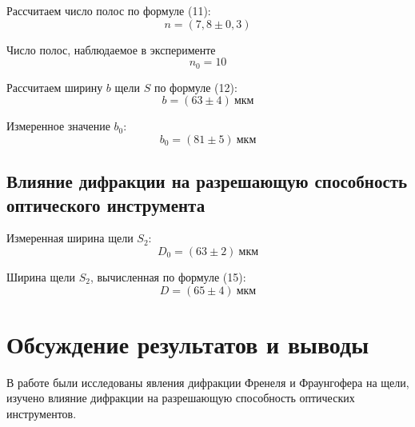 \documentclass[a4paper, 12pt]{article}
\begin{document}
Рассчитаем число полос по формуле (11):
\[
    n = (7,8 \pm 0,3) 
\]

Число полос, наблюдаемое в эксперименте
\[
    n_0 = 10
\]

Рассчитаем ширину $b$ щели $S$ по формуле (12):
\[
    b = (63\pm 4)\ \text{мкм}
\]

Измеренное значение  $b_0$:
\[
    b_0 = (81\pm 5)\ \text{мкм}
\]

\subsection*{Влияние дифракции на разрешающую способность оптического
инструмента}
Измеренная ширина щели $S_2$:
\[
    D_0 = (63\pm 2)\ \text{мкм}
\]

Ширина щели $S_2$, вычисленная по формуле (15):
\[
    D = (65 \pm 4)\ \text{мкм}
\]



\section{Обсуждение результатов и выводы}
В работе были исследованы явления дифракции Френеля и Фраунгофера на
щели, изучено влияние дифракции на разрешающую способность оптических
инструментов.
\end{document}
